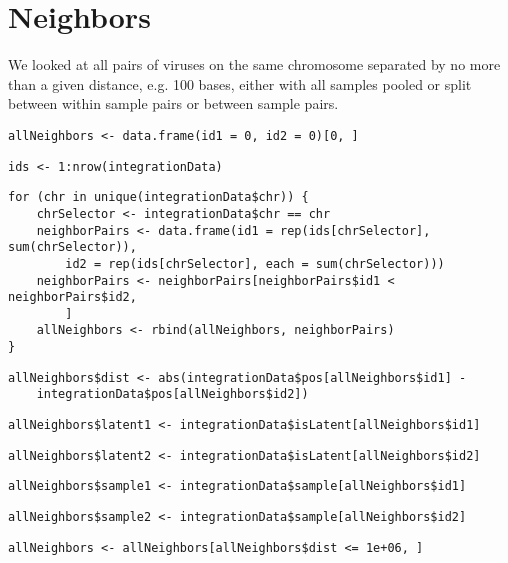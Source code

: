 \documentclass[../../sherrill-Mix_thesis.tex]{subfiles}
\makeatletter
\newenvironment{kframe}{%
 \def\at@end@of@kframe{}%
 \ifinner\ifhmode%
  \def\at@end@of@kframe{\end{minipage}}%
  \begin{minipage}{\columnwidth}%
 \fi\fi%
 \def\FrameCommand##1{\hskip\@totalleftmargin \hskip-\fboxsep
 \colorbox{shadecolor}{##1}\hskip-\fboxsep
     \hskip-\linewidth \hskip-\@totalleftmargin \hskip\columnwidth}%
 \MakeFramed {\advance\hsize-\width
   \@totalleftmargin\z@ \linewidth\hsize
   \@setminipage}}%
 {\par\unskip\endMakeFramed%
 \at@end@of@kframe}
\newenvironment{knitrout}{}{} %
\makeatother
\begin{document}
\section{Neighbors}
We looked at all pairs of viruses on the same chromosome separated by no more than a given distance, e.g. 100 bases, either with all samples pooled or split between within sample pairs or between sample pairs.
\begin{knitrout}
\color{fgcolor}\begin{kframe}
\begin{lstlisting}[basicstyle=\ttfamily,breaklines=true]
allNeighbors <- data.frame(id1 = 0, id2 = 0)[0, ]\end{lstlisting}
\begin{lstlisting}[basicstyle=\ttfamily,breaklines=true]
ids <- 1:nrow(integrationData)\end{lstlisting}
\begin{lstlisting}[basicstyle=\ttfamily,breaklines=true]
for (chr in unique(integrationData$chr)) {
    chrSelector <- integrationData$chr == chr
    neighborPairs <- data.frame(id1 = rep(ids[chrSelector], sum(chrSelector)), 
        id2 = rep(ids[chrSelector], each = sum(chrSelector)))
    neighborPairs <- neighborPairs[neighborPairs$id1 < neighborPairs$id2, 
        ]
    allNeighbors <- rbind(allNeighbors, neighborPairs)
}\end{lstlisting}
\begin{lstlisting}[basicstyle=\ttfamily,breaklines=true]
allNeighbors$dist <- abs(integrationData$pos[allNeighbors$id1] - 
    integrationData$pos[allNeighbors$id2])\end{lstlisting}
\begin{lstlisting}[basicstyle=\ttfamily,breaklines=true]
allNeighbors$latent1 <- integrationData$isLatent[allNeighbors$id1]\end{lstlisting}
\begin{lstlisting}[basicstyle=\ttfamily,breaklines=true]
allNeighbors$latent2 <- integrationData$isLatent[allNeighbors$id2]\end{lstlisting}
\begin{lstlisting}[basicstyle=\ttfamily,breaklines=true]
allNeighbors$sample1 <- integrationData$sample[allNeighbors$id1]\end{lstlisting}
\begin{lstlisting}[basicstyle=\ttfamily,breaklines=true]
allNeighbors$sample2 <- integrationData$sample[allNeighbors$id2]\end{lstlisting}
\begin{lstlisting}[basicstyle=\ttfamily,breaklines=true]
allNeighbors <- allNeighbors[allNeighbors$dist <= 1e+06, ]\end{lstlisting}
\end{kframe}
\end{knitrout}
\end{document}
